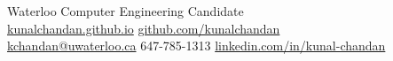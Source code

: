 \documentclass[]{chandan-cv}
\begin{document}
%
%

%
%
{
	Waterloo Computer Engineering Candidate \\
	\href{http://kunalchandan.github.io}{kunalchandan.github.io}
	\hfill
	\href{http://github.com/kunalchandan}{github.com/kunalchandan}\\
	\href{mailto:kchandan@uwaterloo.ca}{kchandan@uwaterloo.ca}
	\hfill
	647-785-1313
	\hfill
	\href{https://www.linkedin.com/in/kunal-chandan/}{linkedin.com/in/kunal-chandan}
}

%
%
\end{document}
